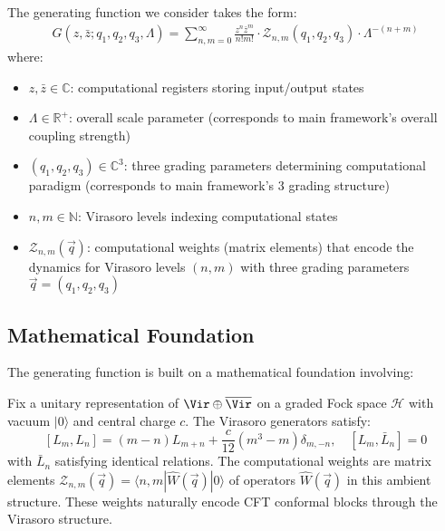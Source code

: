 \begin{definition}
\label{def:generating-function}
The generating function we consider takes the form:
\begin{align}
\label{eq:generating-function}
G(z, \bar{z}; q_1, q_2, q_3, \Lambda) = \sum_{n,m=0}^{\infty} \frac{z^n \bar{z}^m}{n! m!} \cdot \mathcal{Z}_{n,m}(q_1, q_2, q_3) \cdot \Lambda^{-(n+m)}
\end{align}
where:
\begin{itemize}
\item $z, \bar{z} \in \mathbb{C}$: computational registers storing input/output states
\item $\Lambda \in \mathbb{R}^+$: overall scale parameter (corresponds to main framework's overall coupling strength)
\item $(q_1, q_2, q_3) \in \mathbb{C}^3$: three grading parameters determining computational paradigm (corresponds to main framework's 3 grading structure)
\item $n, m \in \mathbb{N}$: Virasoro levels indexing computational states
\item $\mathcal{Z}_{n,m}(\vec{q})$: computational weights (matrix elements) that encode the dynamics for Virasoro levels $(n,m)$ with three grading parameters $\vec{q}=(q_1, q_2, q_3)$
\end{itemize}
\end{definition}

\subsection{Mathematical Foundation}

The generating function is built on a mathematical foundation involving:

\begin{definition}
\label{def:ambient-structure}
Fix a unitary representation of $\Vir\oplus\overline{\Vir}$ on a graded Fock space $\mathcal{H}$ with vacuum $|0\rangle$ and central charge $c$. The Virasoro generators satisfy:
\[
[L_m,L_n]=(m-n)L_{m+n}+\frac{c}{12}(m^3-m)\delta_{m,-n}, \quad [L_m,\bar L_n]=0
\]
with $\bar L_n$ satisfying identical relations. The computational weights are matrix elements $\mathcal{Z}_{n,m}(\vec{q}) = \langle n,m|\hat{W}(\vec{q})|0\rangle$ of operators $\hat{W}(\vec{q})$ in this ambient structure. These weights naturally encode CFT conformal blocks through the Virasoro structure.
\end{definition}

